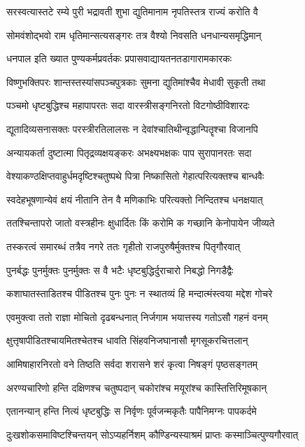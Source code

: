 \twolineshloka
{सरस्वत्यास्तटे रम्ये पुरी भद्रावती शुभा}
{द्युतिमानाम नृपतिस्तत्र राज्यं करोति वै} %

\twolineshloka
{सोमवंशोद्भवो राम धृतिमान्सत्यसङ्गरः}
{तत्र वैश्यो निवसति धनधान्यसमृद्धिमान्} %

\twolineshloka
{धनपाल इति ख्यात पुण्यकर्मप्रवर्तकः}
{प्रपासवाद्यायतनतडागारामकारकः} %

\twolineshloka
{विष्णुभक्तिपरः शान्तस्तस्यांसपञ्चपुत्रकाः}
{सुमना द्युतिमांश्चैव मेधावी सुकृती तथा} %

\twolineshloka
{पञ्चमो धृष्टबुद्धिश्च महापापरतः सदा}
{वारस्त्रीसङ्गनिरतो विटगोष्ठीविशारदः} %

{द्यूतादिव्यसनासक्तः परस्त्रीरतिलालसः}
{न देवांश्चातिथीन्वृद्धान्पितॄश्चा विजानपि} %

\twolineshloka
{अन्यायकर्ता दुष्टात्मा पितृद्रव्यक्षयङ्करः}
{अभक्ष्यभक्षकः पाप सुरापानरतः सदा} %

\twolineshloka
{वेश्याकण्ठक्षिप्तवाहुर्धमदृष्टिश्चतुष्पथे}
{पित्रा निष्कासितो गेहात्परित्यक्तश्च बान्धवैः} %

\twolineshloka
{स्वदेहभूषणान्येवं क्षयं नीतानि तेन वै}
{मणिकाभिः परित्यक्तो निन्दितश्च धनक्षयात्} %

\twolineshloka
{ततश्चिन्तापरो जातो वस्त्रहीनः क्षुधार्दितः}
{किं करोमि क गच्छानि केनोपायेन जीव्यते} %

\twolineshloka
{तस्करत्वं समारब्धं तत्रैव नगरे ततः}
{गृहीतो राजपुरुषैर्मुक्तश्च पितृगौरवात्} %

\twolineshloka
{पुनर्बद्धः पुनर्मुक्तः पुनर्मुक्तः स वै भटैः}
{धृष्टबुद्धिर्दुराचारो निबद्धो निगडैद्वैः} %

\twolineshloka
{कशाघातस्ताडितश्च पीडितश्च पुनः पुनः}
{न स्थातव्यं हि मन्दात्मंस्त्वया मद्देश गोचरे} %

\twolineshloka
{एवमुक्त्वा ततो राज्ञा मोचितो दृढबन्धनात्}
{निर्जगाम भयात्तस्य गतोऽसौ गहनं वनम्} %

\twolineshloka
{क्षुत्तृषापीडितश्चायमितश्चेतश्च धावति}
{सिंहवनिजघानासौ मृगसूकरचित्तलान्} %

\twolineshloka
{आमिषाहारनिरतो वने तिष्ठति सर्वदा}
{शरासने शरं कृत्वा निषङ्गं पृष्ठसङ्गतम्} %

\twolineshloka
{अरण्यचारिणो हन्ति दक्षिणश्च चतुष्पदान्}
{चकोरांश्च मयूरांश्च कास्तित्तिरिमूषकान्} %

\twolineshloka
{एतानन्यान् हन्ति नित्यं धृष्टबुद्धिः स निर्वृणः}
{पूर्वजन्मकृतैः पापैनिमग्नः पापकर्दमे} %

\twolineshloka
{दुःखशोकसमाविष्टश्चिन्तयन् सोऽप्यहर्निशम्}
{कौण्डिन्यस्याश्रमं प्राप्तः कस्माञ्चित्पुण्यगौरवात्} %

